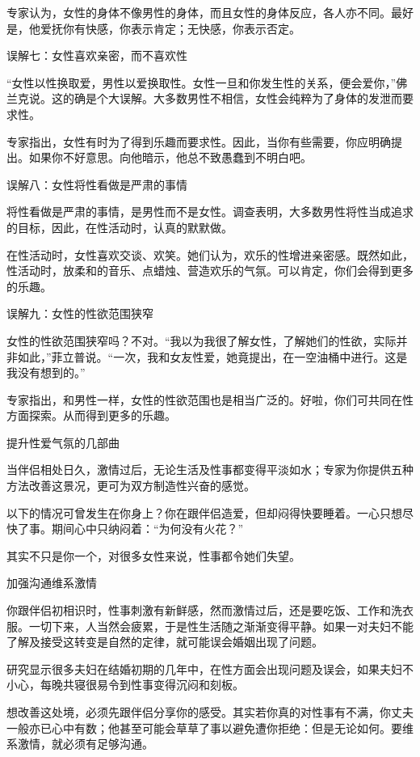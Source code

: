 \documentclass[12pt,UTF8,openany]{ctexbook}
\begin{document}
专家认为，女性的身体不像男性的身体，而且女性的身体反应，各人亦不同。最好是，他爱抚你有快感，你表示肯定；无快感，你表示否定。

误解七：女性喜欢亲密，而不喜欢性

“女性以性换取爱，男性以爱换取性。女性一旦和你发生性的关系，便会爱你，”佛兰克说。这的确是个大误解。大多数男性不相信，女性会纯粹为了身体的发泄而要求性。

专家指出，女性有时为了得到乐趣而要求性。因此，当你有些需要，你应明确提出。如果你不好意思。向他暗示，他总不致愚蠢到不明白吧。

误解八：女性将性看做是严肃的事情

将性看做是严肃的事情，是男性而不是女性。调查表明，大多数男性将性当成追求的目标，因此，在性活动时，认真的默默做。

在性活动时，女性喜欢交谈、欢笑。她们认为，欢乐的性增进亲密感。既然如此，性活动时，放柔和的音乐、点蜡烛、营造欢乐的气氛。可以肯定，你们会得到更多的乐趣。

误解九：女性的性欲范围狭窄

女性的性欲范围狭窄吗？不对。“我以为我很了解女性，了解她们的性欲，实际并非如此，”菲立普说。“一次，我和女友性爱，她竟提出，在一空油桶中进行。这是我没有想到的。”

专家指出，和男性一样，女性的性欲范围也是相当广泛的。好啦，你们可共同在性方面探索。从而得到更多的乐趣。





提升性爱气氛的几部曲


当伴侣相处日久，激情过后，无论生活及性事都变得平淡如水；专家为你提供五种方法改善这景况，更可为双方制造性兴奋的感觉。

以下的情况可曾发生在你身上？你在跟伴侣造爱，但却闷得快要睡着。一心只想尽快了事。期间心中只纳闷着：“为何没有火花？”

其实不只是你一个，对很多女性来说，性事都令她们失望。

加强沟通维系激情

你跟伴侣初相识时，性事刺激有新鲜感，然而激情过后，还是要吃饭、工作和洗衣服。一切下来，人当然会疲累，于是性生活随之渐渐变得平静。如果一对夫妇不能了解及接受这转变是自然的定律，就可能误会婚姻出现了问题。

研究显示很多夫妇在结婚初期的几年中，在性方面会出现问题及误会，如果夫妇不小心，每晚共寝很易令到性事变得沉闷和刻板。

想改善这处境，必须先跟伴侣分享你的感受。其实若你真的对性事有不满，你丈夫一般亦已心中有数；他甚至可能会草草了事以避免遭你拒绝：但是无论如何。要维系激情，就必须有足够沟通。
\end{document}
